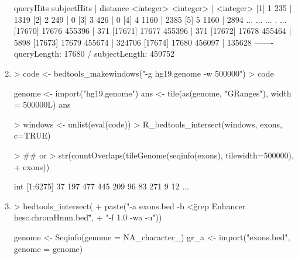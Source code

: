 \documentclass[10pt]{article}
\begin{document}
\begin{enumerate}
\begin{Schunk}
\begin{Soutput}
          queryHits subjectHits |  distance
          <integer>   <integer> | <integer>
      [1]         1         235 |      1319
      [2]         2         249 |         0
      [3]         3         426 |         0
      [4]         4        1160 |      2385
      [5]         5        1160 |      2894
      ...       ...         ... .       ...
  [17670]     17676      455396 |       371
  [17671]     17677      455396 |       371
  [17672]     17678      455464 |      5898
  [17673]     17679      455674 |    324706
  [17674]     17680      456097 |    135628
  -------
  queryLength: 17680 / subjectLength: 459752
\end{Soutput}
\end{Schunk}
\item
\begin{Schunk}
\begin{Sinput}
> code <- bedtools_makewindows("-g hg19.genome -w 500000")
> code
\end{Sinput}
\begin{Soutput}
{
    genome <- import("hg19.genome")
    ans <- tile(as(genome, "GRanges"), width = 500000L)
    ans
}
\end{Soutput}
\begin{Sinput}
> windows <- unlist(eval(code))
> R_bedtools_intersect(windows, exons, c=TRUE)
\end{Sinput}
\begin{Sinput}
> ## or
> str(countOverlaps(tileGenome(seqinfo(exons), tilewidth=500000), 
+                   exons))
\end{Sinput}
\begin{Soutput}
 int [1:6275] 37 197 477 445 209 96 83 271 9 12 ...
\end{Soutput}
\end{Schunk}
\item 
\begin{Schunk}
\begin{Sinput}
> bedtools_intersect(
+     paste("-a exons.bed -b <\"grep Enhancer hesc.chromHmm.bed\"",
+           "-f 1.0 -wa -u"))
\end{Sinput}
\begin{Soutput}
{
    genome <- Seqinfo(genome = NA_character_)
    gr_a <- import("exons.bed", genome = genome)
}
\end{Soutput}
\end{Schunk}
\end{enumerate}
\end{document}

